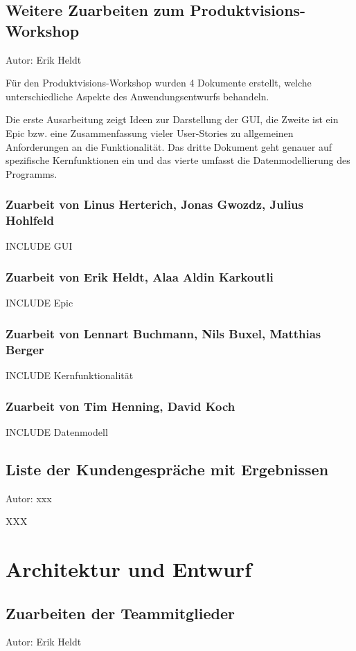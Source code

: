 \documentclass[twoside]{report}
\begin{document}
\subsection{Weitere Zuarbeiten zum Produktvisions-Workshop}
{\small Autor: Erik Heldt}

Für den Produktvisions-Workshop wurden 4 Dokumente erstellt, welche unterschiedliche Aspekte des Anwendungsentwurfs behandeln.

Die erste Ausarbeitung zeigt Ideen zur Darstellung der GUI, die Zweite ist ein Epic bzw. eine Zusammenfassung vieler User-Stories zu allgemeinen Anforderungen an die Funktionalität. Das dritte Dokument geht genauer auf spezifische Kernfunktionen ein und das vierte umfasst die Datenmodellierung des Programms.

\subsubsection{Zuarbeit von Linus Herterich, Jonas Gwozdz, Julius Hohlfeld}
INCLUDE GUI

\subsubsection{Zuarbeit von Erik Heldt, Alaa Aldin Karkoutli}
INCLUDE Epic

\subsubsection{Zuarbeit von Lennart Buchmann, Nils Buxel, Matthias Berger}
INCLUDE Kernfunktionalität

\subsubsection{Zuarbeit von Tim Henning, David Koch}
INCLUDE Datenmodell

\subsection{Liste der Kundengespräche mit Ergebnissen}
{\small Autor: xxx}

XXX



\section{Architektur und Entwurf}

\subsection{Zuarbeiten der Teammitglieder}
{\small Autor: Erik Heldt}
\end{document}
